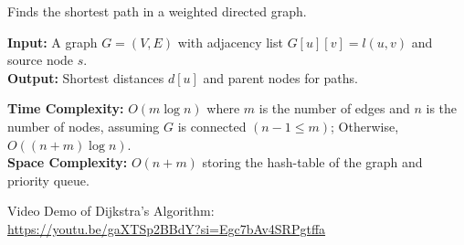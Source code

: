\newpage
\begin{Func}

    Finds the shortest path in a weighted directed graph.

    \vspace{.5em}
    \noindent
    \textbf{Input:} A graph $G = (V, E)$ with adjacency list $G[u][v] = l(u, v)$ and source node $s$.\\
    \textbf{Output:} Shortest distances $d[u]$ and parent nodes for paths.

    \begin{algorithm}[H]
        \SetAlgoLined
    \end{algorithm}

    \noindent
    \textbf{Time Complexity:} $O(m\log n)$ where $m$ is the number of edges and $n$ is the number of nodes, assuming $G$ is connected $(n-1\leq m)$; Otherwise,
    $O((n+m)\log n)$.\\
    \textbf{Space Complexity:} $O(n+m)$ storing the hash-table of the graph and priority queue.
\end{Func}

\begin{Tip}
    Video Demo of Dijkstra's Algorithm:\\
    \href{https://youtu.be/gaXTSp2BBdY?si=Egc7bAv4SRPgtffa}{https://youtu.be/gaXTSp2BBdY?si=Egc7bAv4SRPgtffa}
\end{Tip}
